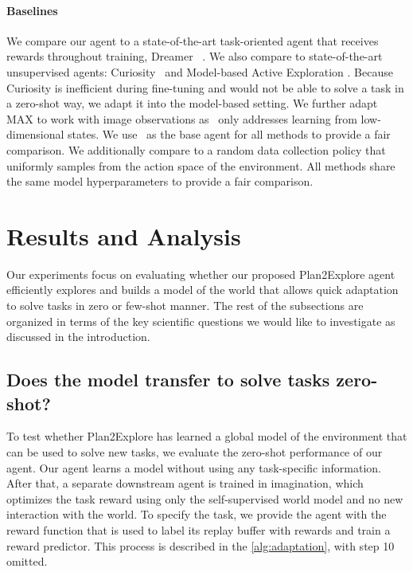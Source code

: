 \documentclass{article}
\begin{document}
\vspace{-0.08in}
\paragraph{Baselines}
We compare our agent to a state-of-the-art task-oriented agent that receives rewards throughout training, Dreamer ~\cite{hafner2019dreamer}. We also compare to state-of-the-art unsupervised agents: Curiosity~\cite{pathakICMl17curiosity} and Model-based Active Exploration \citep[MAX]{shyam2019max}. Because Curiosity is inefficient during fine-tuning and would not be able to solve a task in a zero-shot way, we adapt it into the model-based setting. We further adapt MAX to work with image observations as~\cite{shyam2019max} only addresses learning from low-dimensional states. We use~\cite{hafner2019dreamer} as the base agent for all methods to provide a fair comparison. We additionally compare to a random data collection policy that uniformly samples from the action space of the environment. %
All methods share the same model hyperparameters to provide a fair comparison. %

%

\section{Results and Analysis}
Our experiments focus on evaluating whether our proposed Plan2Explore agent efficiently explores and builds a model of the world that allows quick adaptation to solve tasks in zero or few-shot manner. The rest of the subsections are organized in terms of the key scientific questions we would like to investigate as discussed in the introduction.

%
%
%
%
%
%
%

%
%
%
%

%

%
\subsection{Does the model transfer to solve tasks zero-shot?}
To test whether Plan2Explore has learned a global model of the environment that can be used to solve new tasks, we evaluate the zero-shot performance of our agent. Our agent learns a model without using any task-specific information. After that, a separate downstream agent is trained in imagination, which optimizes the task reward using only the self-supervised world model and no new interaction with the world. To specify the task, we provide the agent with the reward function that is used to label its replay buffer with rewards and train a reward predictor. This process is described in the \cref{alg:adaptation}, with step 10 omitted.
\end{document}
